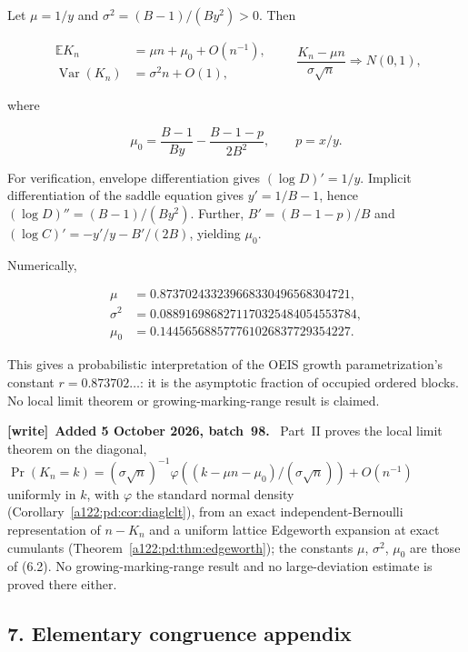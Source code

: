 \documentclass[11pt,letterpaper]{article}
\newenvironment{writenote}[1][]{\par\smallskip\begingroup\small
 \noindent\textbf{[write]}\if\relax\detokenize{#1}\relax\else~\textbf{#1.}\fi\ }%
 {\par\endgroup\smallskip}
\numberwithin{equation}{subsection}
\theoremstyle{definition}
\theoremstyle{remark}
\theoremstyle{plain}
\begin{document}
Let \(\mu=1/y\) and \(\sigma^2=(B-1)/(B y^2)>0\). Then

\[
 \begin{aligned}\mathbb EK_n&=\mu n+\mu_0+O(n^{-1}),\\
 \operatorname{Var}(K_n)&=\sigma^2 n+O(1),\end{aligned}
 \qquad \frac{K_n-\mu n}{\sigma\sqrt n}\Longrightarrow N(0,1),\tag{6.2}
\]

where

\[
 \mu_0=\frac{B-1}{B y}-\frac{B-1-p}{2B^2},\qquad p=x/y.
\]

For verification, envelope differentiation gives \((\log D)'=1/y\). Implicit differentiation of the saddle equation gives \(y'=1/B-1\), hence \((\log D)''=(B-1)/(By^2)\). Further, \(B'=(B-1-p)/B\) and \((\log C)'=-y'/y-B'/(2B)\), yielding \(\mu_0\).

Numerically,

\[
\begin{aligned} \mu&=0.873702433239668330496568304721,\\
 \sigma^2&=0.0889169868271170325484054553784,\\
 \mu_0&=0.144565688577761026837729354227.\end{aligned}
\]

This gives a probabilistic interpretation of the OEIS growth parametrization's constant \(r=0.873702\ldots\): it is the asymptotic fraction of occupied ordered blocks. No local limit theorem or growing-marking-range result is claimed.

\begin{writenote}[Added 5 October 2026, batch~98]
Part~II proves the local limit theorem on the diagonal,
\(\Pr(K_n=k)=(\sigma\sqrt n)^{-1}\varphi((k-\mu n-\mu_0)/(\sigma\sqrt
n))+O(n^{-1})\) uniformly in \(k\), with \(\varphi\) the standard normal
density (Corollary~\ref{a122:pd:cor:diaglclt}),
from an exact independent-Bernoulli representation of \(n-K_n\) and a
uniform lattice Edgeworth expansion at exact cumulants
(Theorem~\ref{a122:pd:thm:edgeworth}); the constants \(\mu\), \(\sigma^2\),
\(\mu_0\) are those of (6.2). No growing-marking-range result and no
large-deviation estimate is proved there either.
\end{writenote}

\subsection{7. Elementary congruence appendix}\label{a122:elementary-congruence-appendix}
\end{document}
